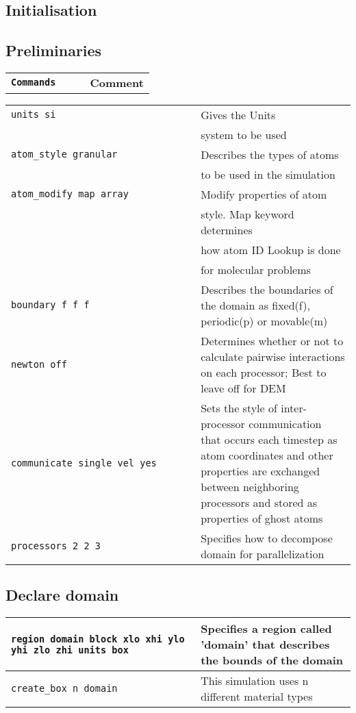 \message{ !name(Cheatsheet.tex)}\documentclass[8pt]{extarticle} %
\begin{document}
\begin{multicols}{3}
\section[Initialisation]{Initialisation}


  \subsection{Preliminaries}
  \begin{tabular}{L{0.55\linewidth} L{0.45\linewidth}}
  \tt \textbf{Commands}         &     \textbf{Comment} \\
  \end{tabular}
  \begin{tabular}{L{0.55\linewidth} L{0.45\linewidth}}
    \tt units si     & Gives the Units \\ & system to be used \\
    \hline
    \tt atom\_style granular        & Describes the types of atoms \\ & to be used in the simulation \\
    \hline
    \tt atom\_modify map array        &  Modify properties of atom \\ & style.  Map keyword determines \\ & how atom ID Lookup is done \\ & for molecular problems  \\
    \hline
    \tt boundary f f f      & Describes the boundaries of the domain as fixed(f), periodic(p) or movable(m)                        \\
    \hline
    \tt newton off                  & Determines whether or not to calculate pairwise interactions on each processor; Best to leave off for DEM          \\
    \hline
    \tt communicate single vel yes                      & Sets the style of inter-processor communication that occurs each timestep as atom coordinates and other properties are exchanged between neighboring processors and stored as properties of ghost atoms         \\
    \hline
  \tt processors 2 2 3                & Specifies how to decompose domain for parallelization \\\hline
  \end{tabular}

  \vspace*{1ex}
  \vspace*{1ex}
  \subsection{Declare domain}
  \begin{tabular}{L{0.55\linewidth} L{0.45\linewidth}}
    \tt region domain block xlo xhi ylo yhi zlo zhi units box                     & Specifies a region called 'domain' that describes the bounds of the domain \\
    \hline
  \tt create\_box n domain         & This simulation uses n different material types\\
  \end{tabular}


\end{multicols}
\end{document}
